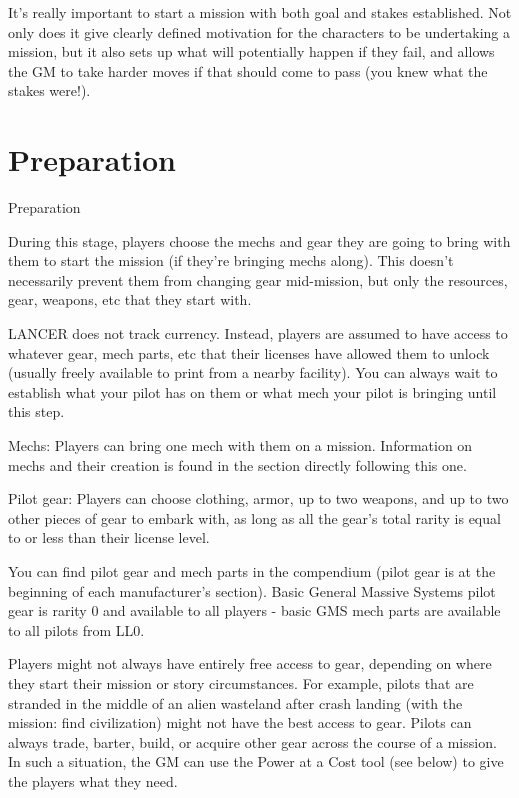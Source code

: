 It’s really important to start a mission with both goal and stakes established. Not only does it
give clearly defined motivation for the characters to be undertaking a mission, but it also sets up
what will potentially happen if they fail, and allows the GM to take harder moves if that should
come to pass (you knew what the stakes were!).

\chapter{Preparation}
                                                Preparation


During this stage, players choose the mechs and gear they are going to bring with them to start
the mission (if they’re bringing mechs along). This doesn’t necessarily prevent them from
changing gear mid-mission, but only the resources, gear, weapons, etc that they start with.


LANCER does not track currency. Instead, players are assumed to have access to whatever gear,
mech parts, etc that their licenses have allowed them to unlock (usually freely available to print
from a nearby facility). You can always wait to establish what your pilot has on them or what
mech your pilot is bringing until this step.


Mechs: Players can bring one mech with them on a mission. Information on mechs and their
creation is found in the section directly following this one.

Pilot gear: Players can choose clothing, armor, up to two weapons, and up to two other
pieces of gear to embark with, as long as all the gear’s total rarity is equal to or less than their
license level.


You can find pilot gear and mech parts in the compendium (pilot gear is at the beginning of each
manufacturer’s section). Basic General Massive Systems pilot gear is rarity 0 and available to all
players - basic GMS mech parts are available to all pilots from LL0.





Players might not always have entirely free access to gear, depending on where they start their
mission or story circumstances. For example, pilots that are stranded in the middle of an alien
wasteland after crash landing (with the mission: find civilization) might not have the best access
to gear. Pilots can always trade, barter, build, or acquire other gear across the course of a
mission. In such a situation, the GM can use the Power at a Cost tool (see below) to give the
players what they need.


